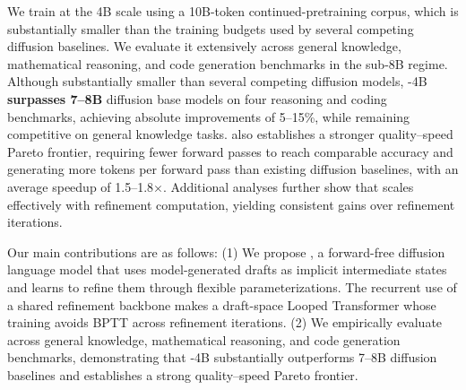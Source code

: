 We train \method at the 4B scale using a 10B-token continued-pretraining corpus, which is substantially smaller than the training budgets used by several competing diffusion baselines.
We evaluate it extensively across general knowledge, mathematical reasoning, and code generation benchmarks in the sub-8B regime.
Although substantially smaller than several competing diffusion models, \method-4B {\bf surpasses 7--8B} diffusion base models on four reasoning and coding benchmarks, achieving absolute improvements of 5--15\%, while remaining competitive on general knowledge tasks.
\method also establishes a stronger quality--speed Pareto frontier, requiring fewer forward passes to reach comparable accuracy and generating more tokens per forward pass than existing diffusion baselines, with an average speedup of 1.5--1.8$\times$.
Additional analyses further show that \method scales effectively with refinement computation, yielding consistent gains over refinement iterations.

Our main contributions are as follows:
(1) We propose \method, a forward-free diffusion language model that uses model-generated drafts as implicit intermediate states and learns to refine them through flexible parameterizations. The recurrent use of a shared refinement backbone makes \method a draft-space Looped Transformer whose training avoids BPTT across refinement iterations.
(2) We empirically evaluate \method across general knowledge, mathematical reasoning, and code generation benchmarks, demonstrating that \method-4B substantially outperforms 7--8B diffusion baselines and establishes a strong quality--speed Pareto frontier.
